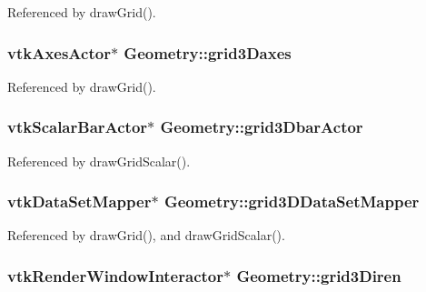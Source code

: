 Referenced by draw\-Grid().

\hypertarget{classGeometry_a09df01c00f88d60da5404fa9f40c01f8}{
\subsubsection[{grid3\-Daxes}]{\setlength{\rightskip}{0pt plus 5cm}vtk\-Axes\-Actor$\ast$ Geometry\-::grid3\-Daxes\hspace{0.3cm}{\ttfamily [protected]}}}\label{classGeometry_a09df01c00f88d60da5404fa9f40c01f8}


Referenced by draw\-Grid().

\hypertarget{classGeometry_af384c0e243c658c029afe53df9e59fd2}{
\subsubsection[{grid3\-Dbar\-Actor}]{\setlength{\rightskip}{0pt plus 5cm}vtk\-Scalar\-Bar\-Actor$\ast$ Geometry\-::grid3\-Dbar\-Actor\hspace{0.3cm}{\ttfamily [protected]}}}\label{classGeometry_af384c0e243c658c029afe53df9e59fd2}


Referenced by draw\-Grid\-Scalar().

\hypertarget{classGeometry_af0f946b3abbf28a76d4c85f51cddd261}{
\subsubsection[{grid3\-D\-Data\-Set\-Mapper}]{\setlength{\rightskip}{0pt plus 5cm}vtk\-Data\-Set\-Mapper$\ast$ Geometry\-::grid3\-D\-Data\-Set\-Mapper\hspace{0.3cm}{\ttfamily [protected]}}}\label{classGeometry_af0f946b3abbf28a76d4c85f51cddd261}


Referenced by draw\-Grid(), and draw\-Grid\-Scalar().

\hypertarget{classGeometry_a7db500f9e6786611a23fe22f562f0dce}{
\subsubsection[{grid3\-Diren}]{\setlength{\rightskip}{0pt plus 5cm}vtk\-Render\-Window\-Interactor$\ast$ Geometry\-::grid3\-Diren\hspace{0.3cm}{\ttfamily [protected]}}}\label{classGeometry_a7db500f9e6786611a23fe22f562f0dce}


